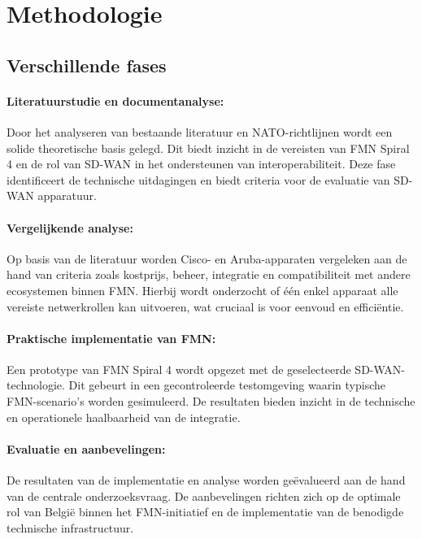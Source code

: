 \section{Methodologie}%
\label{sec:methodologie}
\subsection{Verschillende fases}
\paragraph{Literatuurstudie en documentanalyse:\\} 
Door het analyseren van bestaande literatuur en NATO-richtlijnen wordt een solide theoretische basis gelegd. Dit biedt inzicht in de vereisten van FMN Spiral 4 en de rol van SD-WAN in het ondersteunen van interoperabiliteit. Deze fase identificeert de technische uitdagingen en biedt criteria voor de evaluatie van SD-WAN apparatuur.

\paragraph{Vergelijkende analyse:\\}
Op basis van de literatuur worden Cisco- en Aruba-apparaten vergeleken aan de hand van criteria zoals kostprijs, beheer, integratie en compatibiliteit met andere ecosystemen binnen FMN. Hierbij wordt onderzocht of één enkel apparaat alle vereiste netwerkrollen kan uitvoeren, wat cruciaal is voor eenvoud en efficiëntie.

\paragraph{Praktische implementatie van FMN:\\}
Een prototype van FMN Spiral 4 wordt opgezet met de geselecteerde SD-WAN-technologie. Dit gebeurt in een gecontroleerde testomgeving waarin typische FMN-scenario's worden gesimuleerd. De resultaten bieden inzicht in de technische en operationele haalbaarheid van de integratie.

\paragraph{Evaluatie en aanbevelingen:\\}
De resultaten van de implementatie en analyse worden geëvalueerd aan de hand van de centrale onderzoeksvraag. De aanbevelingen richten zich op de optimale rol van België binnen het FMN-initiatief en de implementatie van de benodigde technische infrastructuur.

